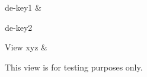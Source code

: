 \hline

de-key1
&

de-key2
\\
\hline
\hline

View xyz
&

This view is for testing purposes only.
\\
\hline
